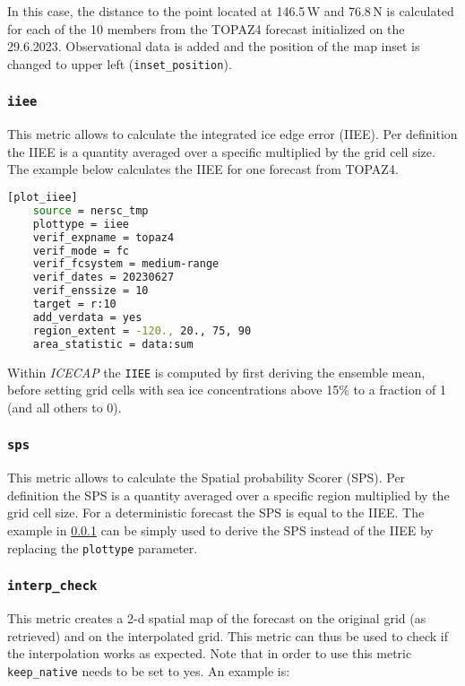 \documentclass[DIV=10, parskip=full]{scrreprt}
\newcommand{\ice}{\textit{ICECAP}\xspace}
\begin{document}
In this case, the distance to the point located at 146.5\,W and 76.8\,N is calculated for each of the 10 members from the TOPAZ4 forecast initialized on the 29.6.2023. Observational data is added and the position of the map inset is changed to upper left (\texttt{inset\_position}).


\subsubsection{\texttt{iiee}}
\label{subsec:iiee}
This metric allows to calculate the integrated ice edge error (IIEE). Per definition the IIEE is a quantity averaged over a specific multiplied by the grid cell size. The example below calculates the IIEE for one forecast from TOPAZ4.

\begin{lstlisting}[language=bash]
	[plot_iiee]
	source = nersc_tmp
	plottype = iiee
	verif_expname = topaz4
	verif_mode = fc
	verif_fcsystem = medium-range
	verif_dates = 20230627
	verif_enssize = 10
	target = r:10
	add_verdata = yes
	region_extent = -120., 20., 75, 90
	area_statistic = data:sum
\end{lstlisting}

Within \ice the \texttt{IIEE} is computed by first deriving the ensemble mean, before setting grid cells with sea ice concentrations above 15\% to a fraction of 1 (and all others to 0). 

\subsubsection{\texttt{sps}}
This metric allows to calculate the Spatial probability Scorer (SPS). Per definition the SPS is a quantity averaged over a specific region multiplied by the grid cell size. For a deterministic forecast the SPS is equal to the IIEE. The example in \ref{subsec:iiee} can be simply used to derive the SPS instead of the IIEE by replacing the \texttt{plottype} parameter. 

\subsubsection{\texttt{interp\_check}}
This metric creates a 2-d spatial map of the forecast on the original grid (as retrieved) and on the interpolated grid. This metric can thus be used to check if the interpolation works as expected. Note that in order to use this metric \texttt{keep\_native} needs to be set to yes. An example is:
\end{document}
